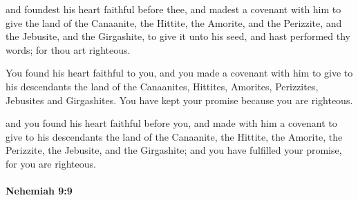 			\begin{versebox}
					\item[BHS] 
					\item[LXX] 
					\item[ASV] and foundest his heart faithful before thee, and madest a covenant with him to give the land of the Canaanite, the Hittite, the Amorite, and the Perizzite, and the Jebusite, and the Girgashite, to give it unto his seed, and hast performed thy words; for thou art righteous.
					\item[NIV] You found his heart faithful to you, and you made a covenant with him to give to his descendants the land of the Canaanites, Hittites, Amorites, Perizzites, Jebusites and Girgashites. You have kept your promise because you are righteous.
					\item[NRSV] and you found his heart faithful before you, and made with him a covenant to give to his descendants the land of the Canaanite, the Hittite, the Amorite, the Perizzite, the Jebusite, and the Girgashite; and you have fulfilled your promise, for you are righteous.
			\end{versebox}

		\paragraph{Nehemiah 9:9} %
			\label{NEHEMIAH-9-9}

